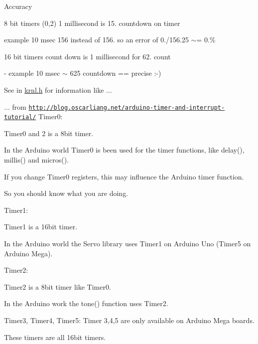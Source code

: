 \begin{DoxyItemize}
\begin{DoxyItemize}
\end{DoxyItemize}
\item Accuracy
\begin{DoxyItemize}
\item 8 bit timers (0,2) 1 millisecond is 15. countdown on timer
\begin{DoxyItemize}
\item example 10 msec 156 instead of 156. so an error of 0./156.25 $\sim$= 0.\%
\end{DoxyItemize}
\item 16 bit timers count down is 1 millisecond for 62. count
\item -\/ example 10 msec $\sim$ 625 countdown == precise \+:-\/)
\end{DoxyItemize}
\end{DoxyItemize}

See in \hyperlink{krnl_8h}{krnl.\+h} for information like ...

... from \href{http://blog.oscarliang.net/arduino-timer-and-interrupt-tutorial/}{\tt http\+://blog.\+oscarliang.\+net/arduino-\/timer-\/and-\/interrupt-\/tutorial/} Timer0\+:
\begin{DoxyItemize}
\item Timer0 and 2 is a 8bit timer.
\item In the Arduino world Timer0 is been used for the timer functions, like delay(), millis() and micros().
\item If you change Timer0 registers, this may influence the Arduino timer function.
\item So you should know what you are doing.
\end{DoxyItemize}

Timer1\+:
\begin{DoxyItemize}
\item Timer1 is a 16bit timer.
\item In the Arduino world the Servo library uses Timer1 on Arduino Uno (Timer5 on Arduino Mega).
\end{DoxyItemize}

Timer2\+:
\begin{DoxyItemize}
\item Timer2 is a 8bit timer like Timer0.
\item In the Arduino work the tone() function uses Timer2.
\end{DoxyItemize}

Timer3, Timer4, Timer5\+: Timer 3,4,5 are only available on Arduino Mega boards.
\begin{DoxyItemize}
\item These timers are all 16bit timers.
\end{DoxyItemize}

